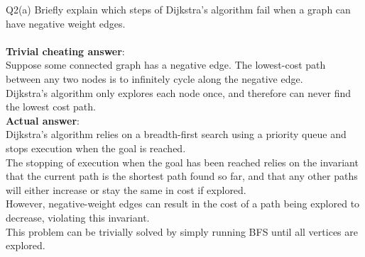 \begin{problem}
  {Q2(a)}
  Briefly explain which steps of Dijkstra's algorithm fail when a graph can have negative weight edges. \\\\
  \textbf{Trivial cheating answer}: \\
  Suppose some connected graph has a negative edge. The lowest-cost path between any two nodes is to infinitely cycle along the negative edge. \\
  Dijkstra's algorithm only explores each node once, and therefore can never find the lowest cost path. \\
  \textbf{Actual answer}: \\
  Dijkstra's algorithm relies on a breadth-first search using a priority queue and stops execution when the goal is reached. \\
  The stopping of execution when the goal has been reached relies on the invariant that the current path is the shortest path found
  so far, and that any other paths will either increase or stay the same in cost if explored. \\
  However, negative-weight edges can result in the cost of a path being explored to decrease, violating this invariant. \\
  This problem can be trivially solved by simply running BFS until all vertices are explored. \\
\end{problem}
